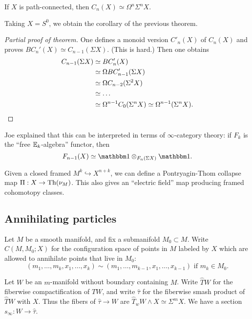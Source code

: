 \documentclass{article}
\begin{document}
\begin{thm}
	If $X$ is path-connected, then $C_n(X) \simeq \Omega^n \Sigma^n X$.
\end{thm}

Taking $X = S^0$, we obtain the corollary of the previous theorem.

\begin{proof}[Partial proof of theorem]
	One defines a monoid version $C'_n(X)$ of $C_n(X)$ and proves $BC_n'(X) \simeq C_{n-1}(\Sigma X)$.
	(This is hard.)
	Then one obtains
	\begin{align*}
		C_{n-1}(\Sigma X) &\simeq BC'_n(X) \\
				  &\simeq \Omega BC'_{n-1}(\Sigma X) \\
				  &\simeq \Omega C_{n-2}(\Sigma^2 X) \\
				  &\simeq \dots \\
				  &\simeq \Omega^{n-1} C_0(\Sigma^n X) \simeq \Omega^{n-1}(\Sigma^n X). \qedhere
	\end{align*}
\end{proof}

\begin{rmk}
	Joe explained that this can be interpreted in terms of $\infty$-category theory: if $F_k$ is the ``free $\mathbb{E}_k$-algebra'' functor, then
	\[
		F_{n-1}(X) \simeq \onebb \otimes_{F_{n}(\Sigma X)} \onebb.
	\]
\end{rmk}

Given a closed framed $M^k \hookrightarrow X^{n+k}$, we can define a Pontryagin-Thom collapse map $\Pi: X \to \operatorname{Th}(\nu_M)$.
This also gives an ``electric field'' map producing framed cohomotopy classes.

\subsection{Annihilating particles}

Let $M$ be a smooth manifold, and fix a submanifold $M_0 \subset M$.
Write $C(M, M_0; X)$ for the configuration space of points in $M$ labeled by $X$ which are allowed to annihilate points that live in $M_0$:
\[
	(m_1, \dots, m_k, x_1, \dots, x_k) \sim (m_1, \dots, m_{k-1}, x_1, \dots, x_{k-1}) \textrm{ if } m_k \in M_0.
\]

Let $W$ be an $m$-manifold without boundary containing $M$.
Write $\hat{T} W$ for the fiberwise compactification of $TW$, and write $\hat{\tau}$ for the fiberwise smash product of $\hat{T} W$ with $X$.
Thus the fibers of $\hat{\tau} \to W$ are $\hat{T}_w W \wedge X \simeq \Sigma^m X$.
We have a section $s_\infty: W \to \hat{\tau}$.
\end{document}
